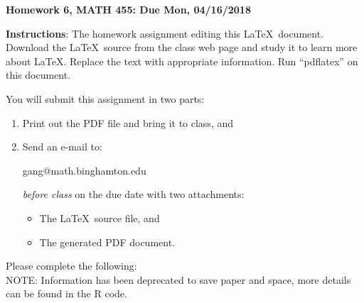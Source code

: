 \documentclass[11pt]{article}
\begin{document}
\begin{title}
	{\Large\bf Homework 6, MATH 455: Due Mon, 04/16/2018}
\end{title}

\author{\bf Your Name: Alexander Van Roijen}

\maketitle
{\bf Instructions}:  The homework assignment editing this \LaTeX\ document.  Download the \LaTeX\ source from the class web page and study
it to learn more about \LaTeX.  Replace the text with appropriate information.  Run ``pdflatex'' on this document.

You will submit this assignment in two parts:
\begin{enumerate}
\item Print out the PDF file and bring it to class, and
\item Send an e-mail to:
\begin{center}
gang@math.binghamton.edu
\end{center}
\emph{before class} on the due date with two attachments:
\begin{itemize}
\item The \LaTeX\ source file, and
\item The generated PDF document.
\end{itemize}
\end{enumerate}
\newpage
Please complete the following:\\
NOTE: Information has been deprecated to save paper and space, more details can be found in the R code.
\end{document}

